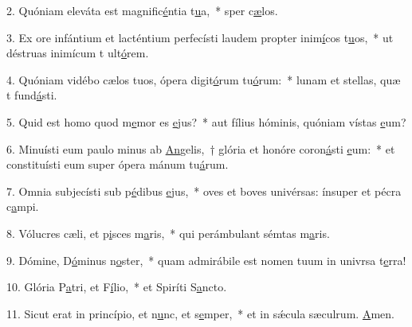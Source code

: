 2. Quóniam eleváta est magnific\uline{é}ntia t\uline{u}a,~* sper c\uline{æ}los.\par 
3. Ex ore infántium et lacténtium perfecísti laudem propter inim\uline{í}cos t\uline{u}os,~* ut déstruas inimícum t ult\uline{ó}rem.\par 
4. Quóniam vidébo cælos tuos, ópera digit\uline{ó}rum tu\uline{ó}rum:~* lunam et stellas, quæ t fund\uline{á}sti.\par 
5. Quid est homo quod m\uline{e}mor es \uline{e}jus?~* aut fílius hóminis, quóniam vístas \uline{e}um?\par 
6. Minuísti eum paulo minus ab \uline{An}gelis,~† glória et honóre coron\uline{á}sti \uline{e}um:~* et constituísti eum super ópera mánum tu\uline{á}rum.\par 
7. Omnia subjecísti sub p\uline{é}dibus \uline{e}jus,~* oves et boves univérsas: ínsuper et pécra c\uline{a}mpi.\par 
8. Vólucres cæli, et p\uline{i}sces m\uline{a}ris,~* qui perámbulant sémtas m\uline{a}ris.\par 
9. Dómine, D\uline{ó}minus n\uline{o}ster,~* quam admirábile est nomen tuum in univrsa t\uline{e}rra!\par 
10. Glória P\uline{a}tri, et F\uline{í}lio,~* et Spiríti S\uline{a}ncto.\par 
11. Sicut erat in princípio, et n\uline{u}nc, et s\uline{e}mper,~* et in sǽcula sæculrum. \uline{A}men.\par 

